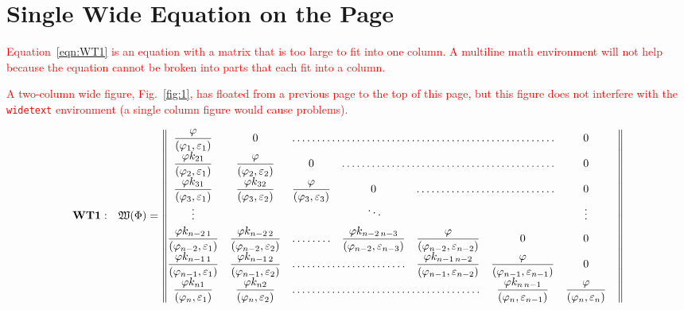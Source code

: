 \section{Single Wide Equation on the Page}

\textcolor{red}{Equation~\eqref{eqn:WT1} is an equation with a matrix that is too large to fit into one column. A multiline math environment will not help because the equation cannot be broken into parts that each fit into a column.}  

\textcolor{red}{A two-column wide figure, Fig.~\ref{fig:1}, has floated from a previous page to the top of this page, but this figure does not interfere with the \texttt{widetext} environment (a single column figure would cause problems).}

\begin{widetext}
\begin{equation}\label{eqn:WT1}
\mathbf{WT1:}\quad
\mathfrak{W}(\bm{\Phi})= \begin{Vmatrix}
\dfrac\varphi{(\varphi_1,\varepsilon_1)}			& 0 												& \hdotsfor{4} 	& 0 			&	\\[\jot]
\dfrac{\varphi k_{21}}{(\varphi_2,\varepsilon_1)}	& \dfrac\varphi{(\varphi_2,\varepsilon_2)}			& 0 			& \hdotsfor{3} 	& 0 \\[\jot]
\dfrac{\varphi k_{31}}{(\varphi_3,\varepsilon_1)}	&\dfrac{\varphi k_{32}}{(\varphi_3,\varepsilon_2)}	& \dfrac\varphi{(\varphi_3,\varepsilon_3)}& 0 & \hdotsfor{2} & 0 \\[\jot]
\vdots 	&  &  & \smash{\rotatebox{15}{$\ddots$}} &  & & \vdots \\[\jot]
\dfrac{\varphi k_{n-2\, 1}}{(\varphi_{n-2},\varepsilon_1)}	&
\dfrac{\varphi k_{n-2\, 2}}{(\varphi_{n-2},\varepsilon_2)}	&\hdotsfor{1} & \dfrac{\varphi k_{n-2\,n-3}}{(\varphi_{n-2},\varepsilon_{n-3})} & \dfrac\varphi{(\varphi_{n-2},\varepsilon_{n-2})}& 0& 0 \\[\jot]
\dfrac{\varphi k_{n-1\, 1}}{(\varphi_{n-1},\varepsilon_1)}	& \dfrac{\varphi k_{n-1\, 2}}{(\varphi_{n-1},\varepsilon_2)} &\hdotsfor{2} & 
\dfrac{\varphi k_{n-1\,n-2}}{(\varphi_{n-1},\varepsilon_{n-2})}& \dfrac{\varphi}{(\varphi_{n-1},\varepsilon_{n-1})} & 0 \\[\jot]
\dfrac{\varphi k_{n1}}{(\varphi_n,\varepsilon_1)}	& \dfrac{\varphi k_{n2}}{(\varphi_n,\varepsilon_2)}	& \hdotsfor{3}	&
\dfrac{\varphi k_{n\,n-1}}{(\varphi_n,\varepsilon_{n-1})} & \dfrac{\varphi}{(\varphi_n,\varepsilon_n)}
\end{Vmatrix}
\end{equation}
\end{widetext}

